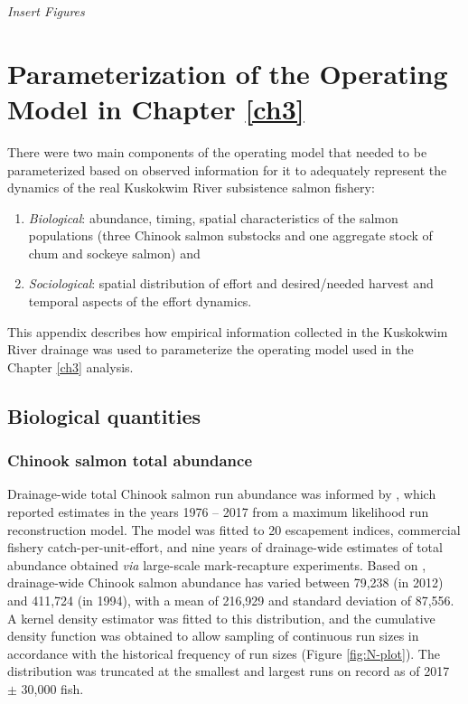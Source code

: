\documentclass[12pt,]{book}
\theoremstyle{definition}
\theoremstyle{definition}
\theoremstyle{definition}
\theoremstyle{remark}
\begin{document}
\emph{Insert Figures}

\setlength{\parskip}{6pt plus 2pt minus 1pt}

\appendix


\chapter{Parameterization of the Operating Model in Chapter
\ref{ch3}}\label{parameterization-of-the-operating-model-in-chapter-refch3}

\noindent
There were two main components of the operating model that needed to be
parameterized based on observed information for it to adequately
represent the dynamics of the real Kuskokwim River subsistence salmon
fishery:

\begin{enumerate}
\def\labelenumi{(\arabic{enumi})}
\item
  \emph{Biological}: abundance, timing, spatial characteristics of the
  salmon populations (three Chinook salmon substocks and one aggregate
  stock of chum and sockeye salmon) and
\item
  \emph{Sociological}: spatial distribution of effort and desired/needed
  harvest and temporal aspects of the effort dynamics.
\end{enumerate}

\noindent
This appendix describes how empirical information collected in the
Kuskokwim River drainage was used to parameterize the operating model
used in the Chapter \ref{ch3} analysis.

\section{Biological quantities}\label{biological-quantities}

\subsection{Chinook salmon total
abundance}\label{chinook-salmon-total-abundance}

\noindent
Drainage-wide total Chinook salmon run abundance was informed by
\citet{liller-etal-2018}, which reported estimates in the years 1976 --
2017 from a maximum likelihood run reconstruction model. The model was
fitted to 20 escapement indices, commercial fishery
catch-per-unit-effort, and nine years of drainage-wide estimates of
total abundance obtained \emph{via} large-scale mark-recapture
experiments. Based on \citet{liller-etal-2018}, drainage-wide Chinook
salmon abundance has varied between 79,238 (in 2012) and 411,724 (in
1994), with a mean of 216,929 and standard deviation of 87,556. A kernel
density estimator was fitted to this distribution, and the cumulative
density function was obtained to allow sampling of continuous run sizes
in accordance with the historical frequency of run sizes (Figure
\ref{fig:N-plot}). The distribution was truncated at the smallest and
largest runs on record as of 2017 \(\pm\) 30,000 fish.
\end{document}
